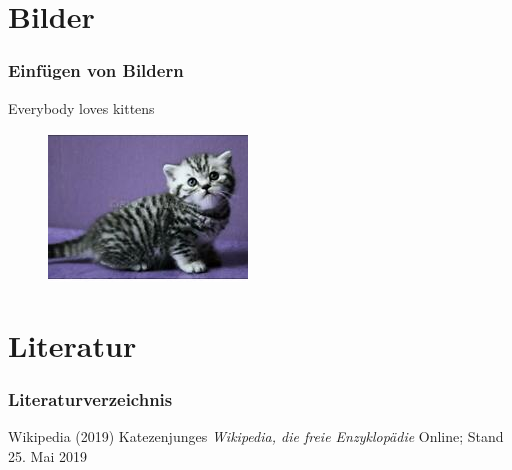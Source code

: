 \documentclass{beamer}
\begin{document}
\section{Bilder}

\begin{frame}
\frametitle{Einfügen von Bildern}
Everybody loves kittens \cite{p1}
\begin{figure}
\includegraphics[width=0.7\linewidth]{kitten.jpg}
\end{figure}
\end{frame}

\section{Literatur}

\begin{frame}
\frametitle{Literaturverzeichnis}
\footnotesize{
\begin{thebibliography}{99}
Wikipedia (2019)
\newblock Katezenjunges
\newblock\emph{Wikipedia{,} die freie Enzyklopädie}
\newblock Online; Stand 25. Mai 2019
\end{thebibliography}
}
\end{frame}
\end{document}
